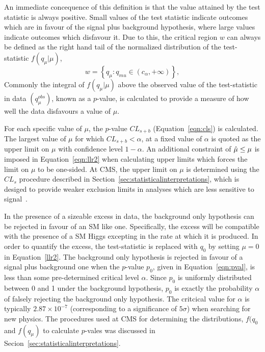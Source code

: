 An immediate concequence of this definition is that the value attained
by the test statistic is always positive. Small values of the test
statistic indicate outcomes which are in favour of the signal plus background 
hypothesis, where large values indicate outcomes which disfavour it.
Due to this, the critical region $w$ can always be defined as the right
hand tail of the normalized distribution of the test-statistic $f(q_{\mu}|\mu)$, 
\begin{equation}
w = \left\{ q_{\mu} : q_{mu} \in (c_{\alpha},+\infty) \right\},
\end{equation}
Commonly the integral of $f(q_{\mu}|\mu)$ above the observed value of the 
test-statistic in data $(q_{\mu}^{obs})$, known as a $p$-value, is calculated
to provide a measure of how well the data disfavours a value of $\mu$. 

For each specific value of $\mu$, the $p$-value $CL_{s+b}$ (Equation~\ref{eqn:cls}) 
is calculated. The largest value of $\mu$ for which $CL_{s+b}<\alpha$,
at a fixed value of $\alpha$ is quoted as the upper limit on $\mu$ with confidence level 
$1-\alpha$. 
An additional constraint of $\hat{\mu} \le \mu$ is imposed in Equation~\ref{eqn:llr2} 
when calculating upper limits which forces the limit on $\mu$ to be one-sided.
At CMS, the upper limit on $\mu$ is determined using the $CL_{s}$
procedure described in Section~\ref{sec:statisticalinterpretations}, which is
desiged to provide weaker exclusion limits in analyses which are less sensitive
to signal~\cite{clspaper}. 

In the presence of a sizeable excess in data, the background only hypothesis
can be rejected in favour of an SM like one. Specifically, the excess 
will be compatible with the presence of a SM Higgs excepting in the rate
at which it is produced. In order to quantify the excess, the test-statistic
is replaced with $q_{0}$ by setting $\mu=0$ in Equation~\ref{llr2}.
The background only hypothesis is rejected in favour of a signal plus background one
when the $p$-value $p_{0}$, given in Equation~\ref{eqn:pval},
is less than some pre-determined critical level $\alpha$.
Since $p_{0}$ is uniformly distributed between 0 and 1 under the background hypothesis,
$p_{0}$ is exactly the probability $\alpha$ of falsely rejecting the background only hypothesis.
The critcical value for $\alpha$ is typically $2.87\times10^{-7}$ (corresponding 
to a significance of $5\sigma$) when searching for new physics.  
The procedures used at CMS for determining the distributions, $f(q_{0}$ and $f(q_{\mu})$
to calculate $p$-vales was discussed in Secion~\ref{sec:statisticalinterpretations}.

